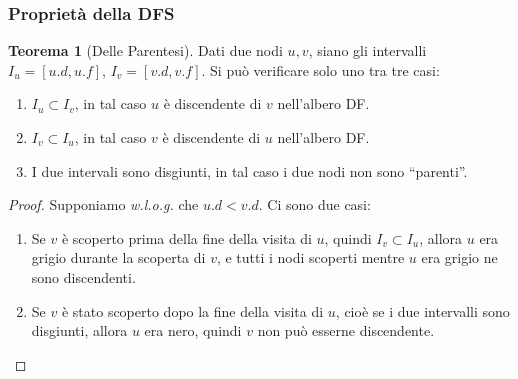 \documentclass[a4paper,10pt]{article}
\theoremstyle{definition}
\newtheorem{teo}[deff]{Teorema}
\begin{document}
\subsubsection{Proprietà della DFS}
\begin{teo}[Delle Parentesi] Dati due nodi $u, v$, siano gli intervalli $I_u = [u.d, u.f]$, $I_v = [v.d, v.f]$. Si può verificare solo uno tra tre casi:
\begin{enumerate}
 \item $I_u \subset I_v$, in tal caso $u$ è discendente di $v$ nell'albero DF.
 \item $I_v \subset I_u$, in tal caso $v$ è discendente di $u$ nell'albero DF.
 \item I due intervali sono disgiunti, in tal caso i due nodi non sono ``parenti''.
\end{enumerate}
\begin{proof}
    Supponiamo \emph{w.l.o.g.} che $u.d<v.d$. Ci sono due casi:
    \begin{enumerate}
     \item Se $v$ è scoperto prima della fine della visita di $u$, quindi $I_v \subset I_u$, allora $u$ era grigio durante la scoperta di $v$, e tutti i nodi scoperti mentre $u$ era grigio ne sono discendenti.
     \item Se $v$ è stato scoperto dopo la fine della visita di $u$, cioè se i due intervalli sono disgiunti, allora $u$ era nero, quindi $v$ non può esserne discendente. 
    \end{enumerate}

\end{proof}

\end{teo}
\newpage
\end{document}
